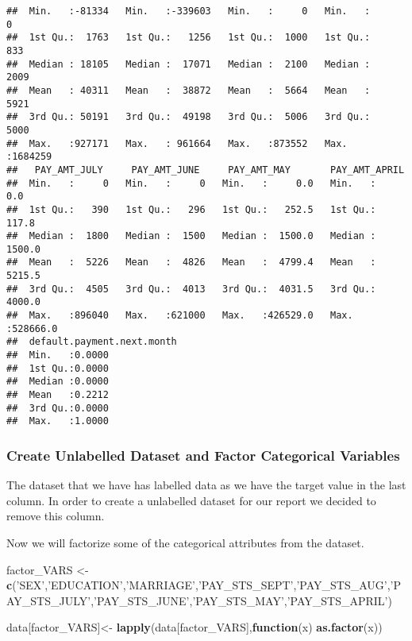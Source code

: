 \documentclass[]{article}
\newenvironment{Shaded}{\begin{snugshade}}{\end{snugshade}}
\newcommand{\KeywordTok}[1]{\textcolor[rgb]{0.13,0.29,0.53}{\textbf{#1}}}
\newcommand{\StringTok}[1]{\textcolor[rgb]{0.31,0.60,0.02}{#1}}
\newcommand{\ControlFlowTok}[1]{\textcolor[rgb]{0.13,0.29,0.53}{\textbf{#1}}}
\newcommand{\OperatorTok}[1]{\textcolor[rgb]{0.81,0.36,0.00}{\textbf{#1}}}
\newcommand{\NormalTok}[1]{#1}
\begin{document}
\begin{verbatim}
##  Min.   :-81334   Min.   :-339603   Min.   :     0   Min.   :      0  
##  1st Qu.:  1763   1st Qu.:   1256   1st Qu.:  1000   1st Qu.:    833  
##  Median : 18105   Median :  17071   Median :  2100   Median :   2009  
##  Mean   : 40311   Mean   :  38872   Mean   :  5664   Mean   :   5921  
##  3rd Qu.: 50191   3rd Qu.:  49198   3rd Qu.:  5006   3rd Qu.:   5000  
##  Max.   :927171   Max.   : 961664   Max.   :873552   Max.   :1684259  
##   PAY_AMT_JULY     PAY_AMT_JUNE     PAY_AMT_MAY       PAY_AMT_APRIL     
##  Min.   :     0   Min.   :     0   Min.   :     0.0   Min.   :     0.0  
##  1st Qu.:   390   1st Qu.:   296   1st Qu.:   252.5   1st Qu.:   117.8  
##  Median :  1800   Median :  1500   Median :  1500.0   Median :  1500.0  
##  Mean   :  5226   Mean   :  4826   Mean   :  4799.4   Mean   :  5215.5  
##  3rd Qu.:  4505   3rd Qu.:  4013   3rd Qu.:  4031.5   3rd Qu.:  4000.0  
##  Max.   :896040   Max.   :621000   Max.   :426529.0   Max.   :528666.0  
##  default.payment.next.month
##  Min.   :0.0000            
##  1st Qu.:0.0000            
##  Median :0.0000            
##  Mean   :0.2212            
##  3rd Qu.:0.0000            
##  Max.   :1.0000
\end{verbatim}

\subsubsection{Create Unlabelled Dataset and Factor Categorical
Variables}\label{create-unlabelled-dataset-and-factor-categorical-variables}

The dataset that we have has labelled data as we have the target value
in the last column. In order to create a unlabelled dataset for our
report we decided to remove this column.

\begin{Shaded}
\end{Shaded}

Now we will factorize some of the categorical attributes from the
dataset.

\begin{Shaded}
\begin{Highlighting}[]
\NormalTok{factor_VARS <-}\StringTok{ }\KeywordTok{c}\NormalTok{(}\StringTok{'SEX'}\NormalTok{,}\StringTok{'EDUCATION'}\NormalTok{,}\StringTok{'MARRIAGE'}\NormalTok{,}\StringTok{'PAY_STS_SEPT'}\NormalTok{,}\StringTok{'PAY_STS_AUG'}\NormalTok{,}\StringTok{'PAY_STS_JULY'}\NormalTok{,}\StringTok{'PAY_STS_JUNE'}\NormalTok{,}\StringTok{'PAY_STS_MAY'}\NormalTok{,}\StringTok{'PAY_STS_APRIL'}\NormalTok{)}

\NormalTok{data[factor_VARS]<-}\StringTok{ }\KeywordTok{lapply}\NormalTok{(data[factor_VARS],}\ControlFlowTok{function}\NormalTok{(x) }\KeywordTok{as.factor}\NormalTok{(x))}
\end{Highlighting}
\end{Shaded}
\end{document}
